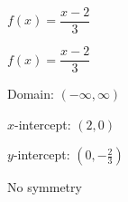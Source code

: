{$f(x) = \dfrac{x - 2}{3}$}
{$f(x) = \dfrac{x - 2}{3}$

Domain: $(-\infty, \infty)$ 

$x$-intercept: $(2, 0)$ 

$y$-intercept: $\left(0, -\frac{2}{3}\right)$ 

No symmetry 

\begin{center}
\end{center}
}